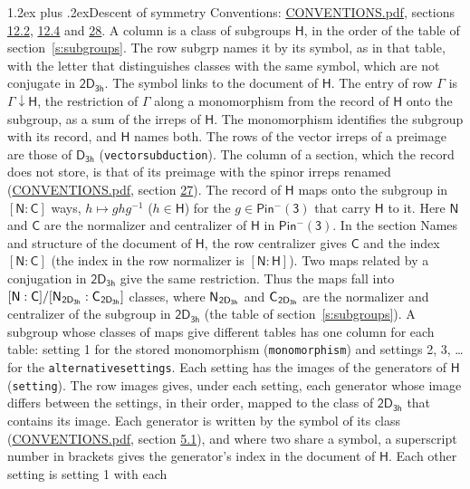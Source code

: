 \documentclass[10pt,a4paper]{article}
\makeatletter
\renewcommand\section{\@startsection{section}{1}{\z@}{-3ex plus -1ex minus -.2ex}%
  {1.2ex plus .2ex}{\normalfont\large\sffamily\bfseries\color{parttitle}}}
\numberwithin{equation}{section}
\newcommand{\grp}[1]{\mathsf{#1}}
\newcommand{\grpindex}[2]{[#1 : #2]}
\newcommand{\restr}[2]{#1\!\downarrow#2}
\newcommand{\hairsp}{\mkern1mu}
\makeatother
\begin{document}
\section{Descent of symmetry}\label{s:subduction}
Conventions: \href{../../CONVENTIONS.pdf}{CONVENTIONS.pdf}, sections \href{../../../rotation/CONVENTIONS.pdf\#conv.12.2}{12.2}, \href{../../../rotation/CONVENTIONS.pdf\#conv.12.4}{12.4} and \href{../../CONVENTIONS.pdf\#conv.28}{28}.
A column is a class of subgroups $\grp{H}$, in the order of the table of section~\ref{s:subgroups}. The row subgrp names it by its symbol, as in that table, with the letter that distinguishes classes with the same symbol, which are not conjugate in $\grp{2D_{3h}}$. The symbol links to the document of $\grp{H}$. The entry of row $\Gamma$ is $\restr{\Gamma}{\grp{H}}$, the restriction of $\Gamma$ along a monomorphism from the record of $\grp{H}$ onto the subgroup, as a sum of the irreps of $\grp{H}$. The monomorphism identifies the subgroup with its record, and $\grp{H}$ names both. The rows of the vector irreps of a preimage are those of \href{../../../rotation/data/pdf/D3h.pdf}{$\grp{D_{3h}}$} (\texttt{vectorsubduction}). The column of a section, which the record does not store, is that of its preimage with the spinor irreps renamed (\href{../../CONVENTIONS.pdf}{CONVENTIONS.pdf}, section \href{../../CONVENTIONS.pdf\#conv.27}{27}). \label{n:group.normalizer.o3}\label{n:group.centralizer.o3}\label{n:element.h}The record of $\grp{H}$ maps onto the subgroup in $\grpindex{\grp{N}}{\grp{C}}$ ways, $h \mapsto g h g^{-1}$ ($h \in \grp{H}$) for the $g \in \grp{Pin^{-}(3)}$ that carry $\grp{H}$ to it. Here $\grp{N}$ and $\grp{C}$ are the normalizer and centralizer of $\grp{H}$ in \href{Pinminus3.pdf}{$\grp{Pin^{-}(3)}$}. In the section Names and structure of the document of $\grp{H}$, the row centralizer gives $\grp{C}$ and the index $\grpindex{\grp{N}}{\grp{C}}$ (the index in the row normalizer is $\grpindex{\grp{N}}{\grp{H}}$). Two maps related by a conjugation in $\grp{2D_{3h}}$ give the same restriction. Thus the maps fall into $\grpindex{\grp{N}}{\grp{C}}/\grpindex{\grp{N}_{\hairsp \grp{2D_{3h}}}}{\grp{C}_{\hairsp \grp{2D_{3h}}}}$ classes, where $\grp{N}_{\hairsp \grp{2D_{3h}}}$ and $\grp{C}_{\hairsp \grp{2D_{3h}}}$ are the normalizer and centralizer of the subgroup in $\grp{2D_{3h}}$ (the table of section~\ref{s:subgroups}). \label{n:head.setting}A subgroup whose classes of maps give different tables has one column for each table: setting 1 for the stored monomorphism (\texttt{monomorphism}) and settings 2, 3, \dots{} for the \texttt{alternativesettings}. Each setting has the images of the generators of $\grp{H}$ (\texttt{setting}). \label{n:head.images}The row images gives, under each setting, each generator whose image differs between the settings, in their order, mapped to the class of $\grp{2D_{3h}}$ that contains its image. Each generator is written by the symbol of its class (\href{../../CONVENTIONS.pdf}{CONVENTIONS.pdf}, section \href{../../../rotation/CONVENTIONS.pdf\#conv.5.1}{5.1}), and where two share a symbol, a superscript number in brackets gives the generator's index in the document of $\grp{H}$. \label{n:irrep.Delta}Each other setting is setting 1 with each 
\end{document}
